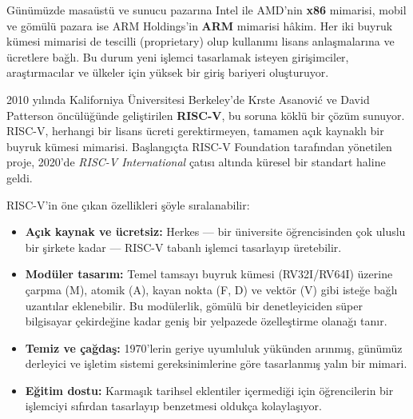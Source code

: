 Günümüzde masaüstü ve sunucu pazarına Intel ile AMD'nin \textbf{x86} mimarisi, mobil ve gömülü pazara ise ARM Holdings'in \textbf{ARM} mimarisi hâkim. Her iki buyruk kümesi mimarisi de tescilli (proprietary) olup kullanımı lisans anlaşmalarına ve ücretlere bağlı. Bu durum yeni işlemci tasarlamak isteyen girişimciler, araştırmacılar ve ülkeler için yüksek bir giriş bariyeri oluşturuyor.

2010 yılında Kaliforniya Üniversitesi Berkeley'de Krste Asanovi\'{c} ve David Patterson öncülüğünde geliştirilen \textbf{RISC-V}, bu soruna köklü bir çözüm sunuyor. RISC-V, herhangi bir lisans ücreti gerektirmeyen, tamamen açık kaynaklı bir buyruk kümesi mimarisi. Başlangıçta RISC-V Foundation tarafından yönetilen proje, 2020'de \emph{RISC-V International} çatısı altında küresel bir standart haline geldi.

RISC-V'in öne çıkan özellikleri şöyle sıralanabilir:
\begin{itemize}
    \item \textbf{Açık kaynak ve ücretsiz:} Herkes --- bir üniversite öğrencisinden çok uluslu bir şirkete kadar --- RISC-V tabanlı işlemci tasarlayıp üretebilir.
    \item \textbf{Modüler tasarım:} Temel tamsayı buyruk kümesi (RV32I/RV64I) üzerine çarpma (M), atomik (A), kayan nokta (F, D) ve vektör (V) gibi isteğe bağlı uzantılar eklenebilir. Bu modülerlik, gömülü bir denetleyiciden süper bilgisayar çekirdeğine kadar geniş bir yelpazede özelleştirme olanağı tanır.
    \item \textbf{Temiz ve çağdaş:} 1970'lerin geriye uyumluluk yükünden arınmış, günümüz derleyici ve işletim sistemi gereksinimlerine göre tasarlanmış yalın bir mimari.
    \item \textbf{Eğitim dostu:} Karmaşık tarihsel eklentiler içermediği için öğrencilerin bir işlemciyi sıfırdan tasarlayıp benzetmesi oldukça kolaylaşıyor.
\end{itemize}

